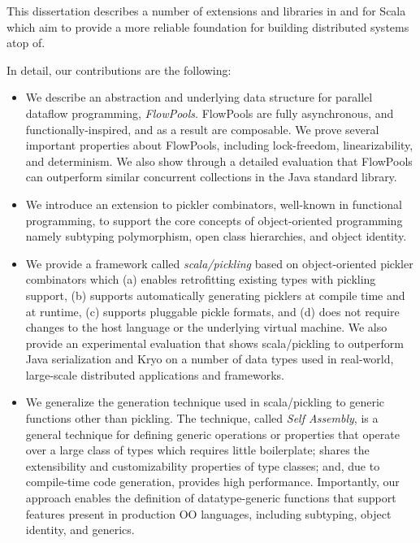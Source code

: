 This dissertation describes a number of extensions and libraries in and for
Scala which aim to provide a more reliable foundation for building distributed
systems atop of.

In detail, our contributions are the following:


\begin{itemize}

	\item We describe an abstraction and underlying data structure for parallel dataflow programming, {\em FlowPools}. FlowPools are fully asynchronous, and functionally-inspired, and as a result are composable. We prove several important properties about FlowPools, including lock-freedom, linearizability, and determinism. We also show through a detailed evaluation that FlowPools can outperform similar concurrent collections in the Java standard library.

	\item We introduce an extension to pickler combinators, well-known in functional programming, to support the core concepts of object-oriented programming namely subtyping polymorphism, open class hierarchies, and object identity.

	\item We provide a framework called {\em scala/pickling} based on object-oriented pickler combinators which (a) enables retrofitting existing types with pickling support, (b) supports automatically generating picklers at compile time and at runtime, (c) supports pluggable pickle formats, and (d) does not require changes to the host language or the underlying virtual machine. We also provide an experimental evaluation that shows scala/pickling to outperform Java serialization and Kryo on a number of data types used in real-world, large-scale distributed applications and frameworks.

	\item We generalize the generation technique used in scala/pickling to generic functions other than pickling. The technique, called {\em Self Assembly}, is a general technique for defining generic operations
  or properties that operate over a large class of types which requires little
  boilerplate; shares the extensibility and customizability properties of type
  classes; and, due to compile-time code generation, provides high performance. Importantly, our approach enables the
  definition of datatype-generic functions that support features present in
  production OO languages, including subtyping, object identity, and generics.


\end{itemize}
